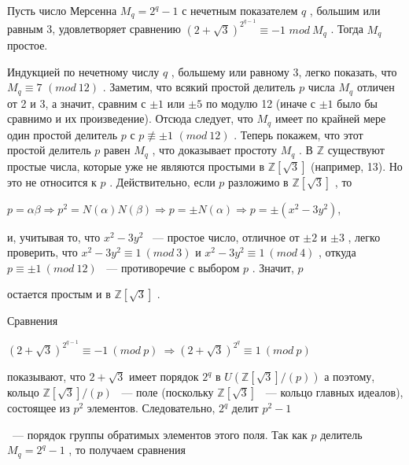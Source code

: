 \begin{sled}
Пусть число Мерсенна $M_q = 2^q - 1$
 с нечетным показателем $q$
 , 
большим или равным 3, удовлетворяет сравнению $(2+\sqrt 3)^{2^{q-1}}\equiv -1$ $mod \ M_q$
 . Тогда $M_q$
 простое. 
\end{sled}
\begin{myproof}

 Индукцией по нечетному числу $q$
 , большему или равному 3, легко 
показать, что $M_q\equiv 7$ $(mod \ 12)$
. Заметим, что всякий простой  
делитель $p$
 числа $M_q$
 отличен от 2 и 3, а значит, сравним с $\pm 1$
 или $\pm 5$
 по модулю 12 (иначе с $\pm 1$
 было бы сравнимо и их  
произведение). Отсюда следует, что $M_q$
 имеет по крайней мере один простой 
делитель $p$ с $p\not\equiv \pm 1$ $(mod \ 12)$
. Теперь покажем, что этот простой 
делитель $p$
 равен $M_q$
 , что доказывает простоту $M_q$
. 
В $\mathbb{Z}$
 существуют простые числа, которые уже не являются  
простыми в $\mathbb{Z}[\sqrt 3]$
 (например, 13). Но это не относится к $p$
 . Действительно, 
если $p$
 разложимо в $\mathbb{Z}[\sqrt 3]$
 , то 

\begin{center}
$p = \alpha\beta \Rightarrow p^2 = N(\alpha)N(\beta) \Rightarrow p=\pm N(\alpha) \Rightarrow p=\pm(x^2 - 3y^2)$,
\end{center}


и, учитывая то, что $x^2-3y^2$
 ~— простое число, отличное от $\pm 2$ и $\pm 3$
 , 
легко проверить, что $x^2 - 3y^2 \equiv 1 \ (mod \ 3)$ и $x^2 -3y^2\equiv 1 \ (mod \ 4)$
, 
откуда $p\equiv\pm 1 \ (mod \ 12)$
 ~— противоречие с выбором $p$
 . Значит, $p$

остается простым и в $\mathbb{Z}[\sqrt 3]$
. 

Сравнения 

\begin{center}
$(2+\sqrt 3)^{2^{q-1}}\equiv -1 \ (mod \ p) \ \Rightarrow (2+\sqrt 3)^{2^q}\equiv 1 \ (mod \ p)$
\end{center}

показывают, что $2+\sqrt 3$
 имеет порядок $2^q$ в $U(\mathbb{Z}[\sqrt 3]/(p))$
 а  
поэтому, кольцо $\mathbb{Z}[\sqrt 3]/(p)$
 ~— поле (поскольку $\mathbb{Z}[\sqrt 3]$
 ~— кольцо главных 
идеалов), состоящее из $p^2$
 элементов. Следовательно, $2^q$
 делит $p^2-1$
 
~— порядок группы обратимых элементов этого поля. Так как $p$
 делитель $M_q = 2^q -1$
 , то получаем сравнения 
\end{myproof}
\newpage
